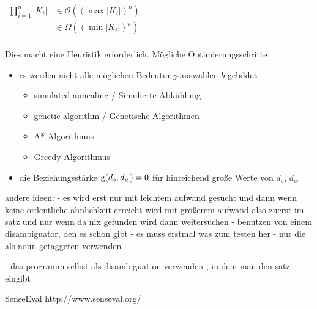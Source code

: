 \iffalse
\begin{center}
$\begin{array}{ll}
\prod_{i=1}^{n} |K_i|	&	\in \mathcal{O}	((\max |K_i|)^n)\\
~			&	\in \Omega	((\min |K_i|)^n)\\
\end{array}$
\end{center}

Dies macht eine Heuristik erforderlich.
Mögliche Optimierungsschritte
\begin{itemize}
 \item es werden nicht alle möglichen Bedeutungsauswahlen $b$ gebildet
 \begin{itemize}
  \item simulated annealing / Simulierte Abkühlung
  \item genetic algorithm / Genetische Algorithmen
  \item A*-Algorithmus
  \item Greedy-Algorithmus
 \end{itemize}
 \item die Beziehungsstärke $\textnormal{g}(d_s,d_w) = 0$ für hinreichend große Werte von $d_s$, $d_w$
\end{itemize} 

andere ideen:
- es wird erst nur mit leichtem aufwand gesucht und dann wenn keine ordentliche ähnlichkeit erreicht wird mit größerem aufwand
also zuerst im satz und nur wenn da nix gefunden wird dann weitersuchen
- benutzen von einem disambiguator, den es schon gibt
- es muss erstmal was zum testen her
- nur die als noun getaggeten verwenden 

- das programm selbst als disambiguation verwenden , in dem man den satz eingibt

SenseEval http://www.senseval.org/

